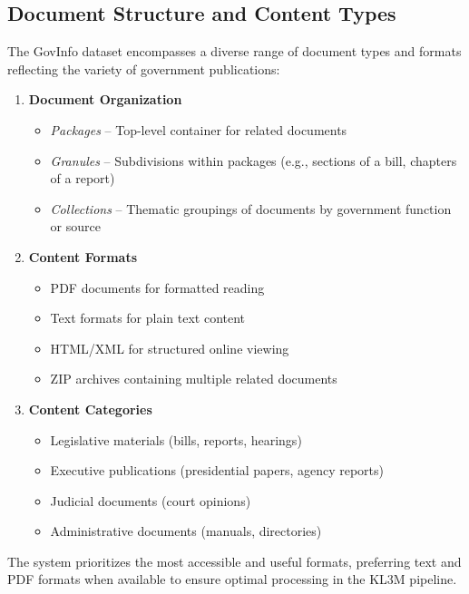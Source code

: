 \subsection{Document Structure and Content Types}

The GovInfo dataset encompasses a diverse range of document types and formats reflecting the variety of government publications:

\begin{enumerate}
    \item \textbf{Document Organization}
    \begin{itemize}
        \item \textit{Packages} -- Top-level container for related documents
        \item \textit{Granules} -- Subdivisions within packages (e.g., sections of a bill, chapters of a report)
        \item \textit{Collections} -- Thematic groupings of documents by government function or source
    \end{itemize}
    
    \item \textbf{Content Formats}
    \begin{itemize}
        \item PDF documents for formatted reading
        \item Text formats for plain text content
        \item HTML/XML for structured online viewing
        \item ZIP archives containing multiple related documents
    \end{itemize}
    
    \item \textbf{Content Categories}
    \begin{itemize}
        \item Legislative materials (bills, reports, hearings)
        \item Executive publications (presidential papers, agency reports)
        \item Judicial documents (court opinions)
        \item Administrative documents (manuals, directories)
    \end{itemize}
\end{enumerate}

The system prioritizes the most accessible and useful formats, preferring text and PDF formats when available to ensure optimal processing in the KL3M pipeline.

